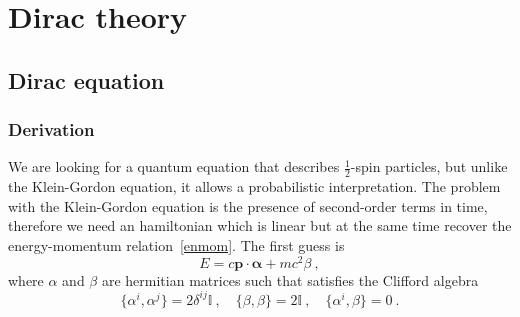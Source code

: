 \part{Dirac theory}

\chapter{Dirac equation}

\section{Derivation}

    We are looking for a quantum equation that describes $\frac{1}{2}$-spin particles, but unlike the Klein-Gordon equation, it allows a probabilistic interpretation. The problem with the Klein-Gordon equation is the presence of second-order terms in time, therefore we need an hamiltonian which is linear but at the same time recover the energy-momentum relation~\eqref{enmom}. The first guess is
    \begin{equation}\label{guess}
        E = c \mathbf p \cdot \boldsymbol \alpha + m c^2 \beta ~,
    \end{equation}
    where $\alpha$ and $\beta$ are hermitian matrices such that satisfies the Clifford algebra 
    \begin{equation}\label{clifford}
        \{\alpha^i, \alpha^j\} = 2 \delta^{ij} \mathbb I ~, \quad \{\beta, \beta\} = 2 \mathbb I ~, \quad \{\alpha^i, \beta\} = 0~.
    \end{equation}
